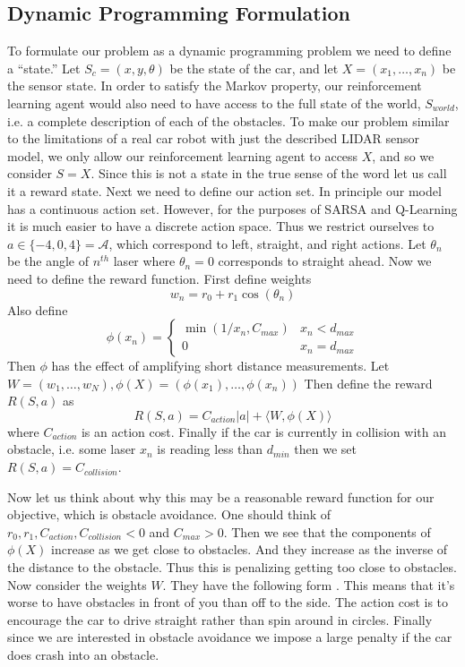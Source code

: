 \documentclass{article}
\begin{document}
\subsection{Dynamic Programming Formulation}
To formulate our problem as a dynamic programming problem we need to define a ``state.'' Let $S_c = (x,y,\theta)$ be the state of the car, and let $X  = (x_1,\ldots,x_n)$ be the sensor state. In order to satisfy the Markov property, our reinforcement learning agent would also need to have access to the full state of the world, $S_{world}$, i.e. a complete description of each of the obstacles.  To make our problem similar to the limitations of a real car robot with just the described LIDAR sensor model, we only allow our reinforcement learning agent to access $X$, and so we consider $S = X$. Since this is not a state in the true sense of the word let us call it a reward state.  Next we need to define our action set. In principle our model has a continuous action set. However, for the purposes of SARSA and Q-Learning it is much easier to have a discrete action space. Thus we restrict ourselves to $a \in \{-4,0,4\} = \mathcal{A}$, which correspond to left, straight, and right actions. Let $\theta_n$ be the angle of $n^{th}$ laser where $\theta_n = 0$ corresponds to straight ahead. Now we need to define the reward function. First define weights
%
%
\begin{equation}
w_n = r_0 + r_1 \cos(\theta_n)
\end{equation}
%
%
Also define
%
%
\begin{equation}
\phi(x_n) = \begin{cases}
\min(1/x_n, C_{max}) & x_n < d_{max}\\
0 & x_n = d_{max} 
\end{cases}
\end{equation}
%
%
Then $\phi$ has the effect of amplifying short distance measurements. Let $W = (w_1,\ldots,w_N), \phi(X) = (\phi(x_1),\ldots,\phi(x_n))$ Then define the reward $R(S,a)$ as
%
%
\begin{equation}
R(S,a) = C_{action} |a| + \langle W, \phi(X) \rangle
\end{equation}
%
%
where $C_{action}$ is an action cost. Finally if the car is currently in collision with an obstacle, i.e. some laser $x_n$ is reading less than $d_{min}$ then we set $R(S,a) = C_{collision}$.

Now let us think about why this may be a reasonable reward function for our objective, which is obstacle avoidance. One should think of $r_0,r_1, C_{action}, C_{collision} < 0$ and $C_{max} > 0$. Then we see that the components of $\phi(X)$ increase as we get close to obstacles. And they increase as the inverse of the distance to the obstacle. Thus this is penalizing getting too close to obstacles. Now consider the weights $W$. They have the following form . This means that it's worse to have obstacles in front of you than off to the side. The action cost is to encourage the car to drive straight rather than spin around in circles. Finally since we are interested in obstacle avoidance we impose a large penalty if the car does crash into an obstacle.
\end{document}
